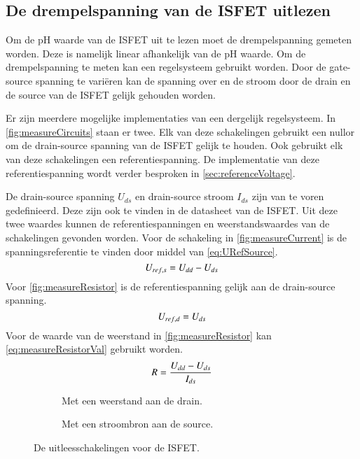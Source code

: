 \subsection{De drempelspanning van de ISFET uitlezen}

Om de pH waarde van de ISFET uit te lezen moet de drempelspanning gemeten worden. Deze is namelijk linear afhankelijk van de pH waarde.
Om de drempelspanning te meten kan een regelsysteem gebruikt worden. Door de gate-source spanning te variëren kan de spanning over en de stroom door de drain en de source van de ISFET gelijk gehouden worden.

Er zijn meerdere mogelijke implementaties van een dergelijk regelsysteem. In \autoref{fig:measureCircuits} staan er twee.
Elk van deze schakelingen gebruikt een nullor om de drain-source spanning van de ISFET gelijk te houden. Ook gebruikt elk van deze schakelingen een referentiespanning. De implementatie van deze referentiespanning wordt verder besproken in \autoref{sec:referenceVoltage}.

De drain-source spanning $U_{ds}$ en drain-source stroom $I_{ds}$ zijn van te voren gedefinieerd. Deze zijn ook te vinden in de datasheet van de ISFET\cite{isfet}. Uit deze twee waardes kunnen de referentiespanningen en weerstandswaardes van de schakelingen gevonden worden.
Voor de schakeling in \autoref{fig:measureCurrent} is de spanningsreferentie te vinden door middel van \autoref{eq:URefSource}.
\begin{equation}\label{eq:URefSource}
    U_{ref,s} = U_{dd} - U_{ds}
    \tagaddtext{[\si{\volt}]}
\end{equation}
Voor \autoref{fig:measureResistor} is de referentiespanning gelijk aan de drain-source spanning.
\begin{equation}\label{eq:URefDrain}
    U_{ref,d} = U_{ds}
    \tagaddtext{[\si{\volt}]}
\end{equation}
Voor de waarde van de weerstand in \autoref{fig:measureResistor} kan \autoref{eq:measureResistorVal} gebruikt worden.
\begin{equation}\label{eq:measureResistorVal}
    R = \frac{U_{dd} - U_{ds}}{I_{ds}}
    \tagaddtext{[\si{\ohm}]}
\end{equation}


\begin{figure}[ht]
    \centering
    \begin{subfigure}[b]{0.45\textwidth}
        \centering
        \def\svgwidth{\textwidth}
        
        \caption{Met een weerstand aan de drain.}
        \label{fig:measureResistor}
    \end{subfigure}
    \hfill
    \begin{subfigure}[b]{0.45\textwidth}
        \centering
        \def\svgwidth{\textwidth}
        
        \caption{Met een stroombron aan de source.}
        \label{fig:measureCurrent}
    \end{subfigure}
    \caption{De uitleesschakelingen voor de ISFET.}
    \label{fig:measureCircuits}
\end{figure}

